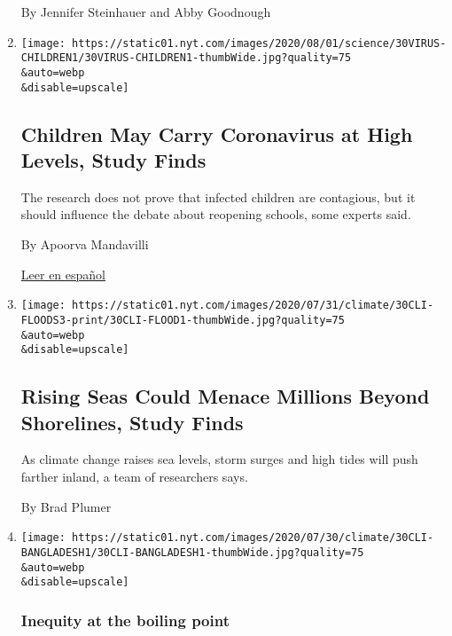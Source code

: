 \begin{enumerate}
  By Jennifer Steinhauer and Abby Goodnough
\item
  \href{/2020/07/30/health/coronavirus-children.html}{}

  \texttt{[image: https://static01.nyt.com/images/2020/08/01/science/30VIRUS-CHILDREN1/30VIRUS-CHILDREN1-thumbWide.jpg?quality=75\\\&auto=webp\\\&disable=upscale]}

  \hypertarget{children-may-carry-coronavirus-at-high-levels-study-finds}{%
  \subsection{Children May Carry Coronavirus at High Levels, Study
  Finds}\label{children-may-carry-coronavirus-at-high-levels-study-finds}}

  The research does not prove that infected children are contagious, but
  it should influence the debate about reopening schools, some experts
  said.

  By Apoorva Mandavilli

  \href{https://www.nytimes.com/es/2020/07/31/espanol/ciencia-y-tecnologia/ninos-contagio-coronavirus.html}{Leer
  en español}
\item
  \href{/2020/07/30/climate/sea-level-inland-floods.html}{}

  \texttt{[image: https://static01.nyt.com/images/2020/07/31/climate/30CLI-FLOODS3-print/30CLI-FLOOD1-thumbWide.jpg?quality=75\\\&auto=webp\\\&disable=upscale]}

  \hypertarget{rising-seas-could-menace-millions-beyond-shorelines-study-finds}{%
  \subsection{Rising Seas Could Menace Millions Beyond Shorelines, Study
  Finds}\label{rising-seas-could-menace-millions-beyond-shorelines-study-finds}}

  As climate change raises sea levels, storm surges and high tides will
  push farther inland, a team of researchers says.

  By Brad Plumer
\item
  \href{/2020/07/30/climate/bangladesh-floods.html}{}

  \texttt{[image: https://static01.nyt.com/images/2020/07/30/climate/30CLI-BANGLADESH1/30CLI-BANGLADESH1-thumbWide.jpg?quality=75\\\&auto=webp\\\&disable=upscale]}

  \hypertarget{inequity-at-the-boiling-point}{%
  \subsubsection{Inequity at the boiling
  point}\label{inequity-at-the-boiling-point}}


\end{enumerate}
